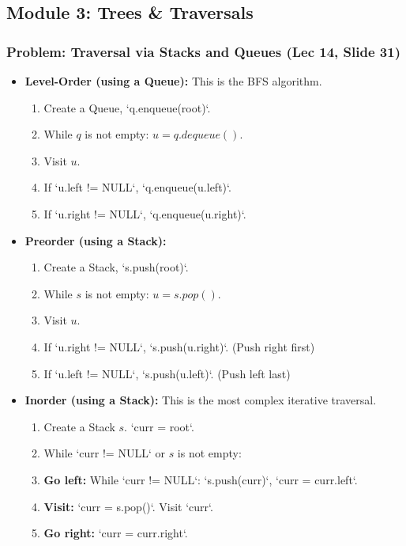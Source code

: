 \subsection{Module 3: Trees \& Traversals}

\subsubsection{Problem: Traversal via Stacks and Queues (Lec 14, Slide 31)}
\begin{itemize}
    \item \textbf{Level-Order (using a Queue):} This is the BFS algorithm.
    \begin{enumerate}
        \item Create a Queue, `q.enqueue(root)`.
        \item While $q$ is not empty: $u = q.dequeue()$.
        \item Visit $u$.
        \item If `u.left != NULL`, `q.enqueue(u.left)`.
        \item If `u.right != NULL`, `q.enqueue(u.right)`.
    \end{enumerate}
    \item \textbf{Preorder (using a Stack):}
    \begin{enumerate}
        \item Create a Stack, `s.push(root)`.
        \item While $s$ is not empty: $u = s.pop()$.
        \item Visit $u$.
        \item If `u.right != NULL`, `s.push(u.right)`. (Push right first)
        \item If `u.left != NULL`, `s.push(u.left)`. (Push left last)
    \end{enumerate}
    \item \textbf{Inorder (using a Stack):} This is the most complex iterative traversal.
    \begin{enumerate}
        \item Create a Stack $s$. `curr = root`.
        \item While `curr != NULL` or $s$ is not empty:
        \item \textbf{Go left:} While `curr != NULL`: `s.push(curr)`, `curr = curr.left`.
        \item \textbf{Visit:} `curr = s.pop()`. Visit `curr`.
        \item \textbf{Go right:} `curr = curr.right`.
    \end{enumerate}
\end{itemize}

